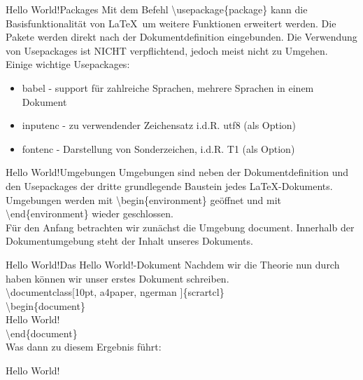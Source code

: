 \begin{frame}{Hello World!}{Packages}
    Mit dem Befehl \color{cred}\textbackslash usepackage\color{black}\{\color{cblue}package\color{black}\} kann die Basisfunktionalit\"at von \LaTeX~um weitere Funktionen erweitert werden. Die Pakete werden direkt nach der Dokumentdefinition eingebunden. Die Verwendung von Usepackages ist NICHT verpflichtend, jedoch meist nicht zu Umgehen.\\\vspace{1mm}
    Einige wichtige Usepackages:
    \begin{itemize}
        \item \color{cblue}babel \color{black}- support f\"ur zahlreiche Sprachen, mehrere Sprachen in einem Dokument
        \item \color{cblue}inputenc \color{black}- zu verwendender Zeichensatz i.d.R. \color{corange}utf8 \color{black}(als Option)
        \item \color{cblue}fontenc \color{black}- Darstellung von Sonderzeichen, i.d.R. \color{corange}T1 \color{black}(als Option)
    \end{itemize}
\end{frame}
\begin{frame}{Hello World!}{Umgebungen}
    Umgebungen sind neben der Dokumentdefinition und den Usepackages der dritte grundlegende Baustein jedes \LaTeX-Dokuments. Umgebungen werden mit \color{cturkis}\textbackslash begin\color{black}\{\color{cpurple}environment\color{black}\} ge\"offnet und mit \color{cturkis}\textbackslash end\color{black}\{\color{cpurple}environment\color{black}\} wieder geschlossen. \\\vspace{1.5mm}F\"ur den Anfang betrachten wir zun\"achst die Umgebung \color{cpurple}document\color{black}. Innerhalb der Dokumentumgebung steht der Inhalt unseres Dokuments.
\end{frame}
\begin{frame}{Hello World!}{Das \glqq Hello World!\grqq-Dokument}
    Nachdem wir die Theorie nun durch haben k\"onnen wir unser erstes Dokument schreiben.\\\vspace{2.5mm}
    \color{cred}\textbackslash documentclass\color{black}[\color{corange}10pt, a4paper, ngerman \color{black}]\{\color{cpurple}scrartcl\color{black}\}\\
    \color{cturkis}\textbackslash begin\color{black}\{\color{cpurple}document\color{black}\}\\
    Hello World!\\
    \color{cturkis}\textbackslash end\color{black}\{\color{cpurple}document\color{black}\}\\\vspace{2.5mm}
    Was dann zu diesem Ergebnis f\"uhrt:\\\vspace{2.5mm}
    \begin{center}\textrm{Hello World!}\end{center}
    
\end{frame}